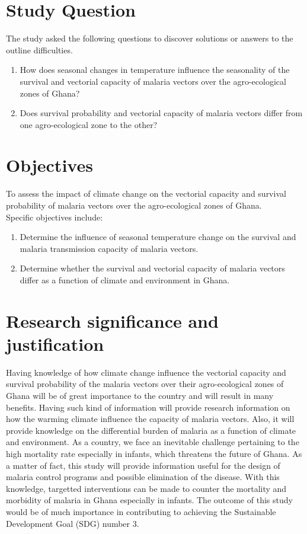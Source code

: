 \section{Study Question}
The study asked the following questions to discover solutions or answers to the outline difficulties.

\begin{enumerate}
	
	\item How does seasonal changes in temperature influence the seasonality of the survival and vectorial capacity of malaria vectors over the agro-ecological zones of Ghana?
	\item Does survival probability and vectorial capacity of malaria vectors differ from one agro-ecological zone to the other?

\end{enumerate}

\section{Objectives}
To assess the impact of climate change on the vectorial capacity and survival probability of malaria vectors over the agro-ecological zones of Ghana.\\
Specific objectives include:\\
\begin{enumerate}
	
	\item Determine the influence of seasonal  temperature  change on the survival and malaria transmission capacity of malaria vectors.
	
	
	\item  Determine whether  the survival and vectorial capacity of malaria vectors differ as a function of climate and environment in Ghana.
	
	
\end{enumerate}

\section{Research significance and justification}
Having knowledge of how climate change influence the vectorial capacity and survival probability of the malaria vectors over their agro-ecological zones of Ghana will be of great importance to the country and will result in many benefits. Having such kind of information will provide research information on how the warming climate influence the capacity of malaria vectors. Also, it will provide knowledge on the differential burden of malaria as a function of climate and environment.
 As a country, we face an inevitable challenge pertaining to the high mortality
 rate especially in infants, which threatens the future of Ghana. As a matter of fact, this study will provide information useful for the design of malaria control programs and possible elimination of the disease.         
With this knowledge, targetted interventions can be made to counter the mortality and morbidity of malaria in Ghana especially in infants. The outcome of this study would be of much importance in contributing to achieving the Sustainable Development Goal (SDG) number 3.
\newpage

